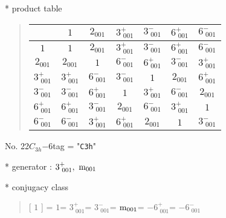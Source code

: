 \documentclass[fleqn,10pt,landscape]{jsarticle}
\begin{document}
* product table
\begin{quote}
\begin{tabular}{ccccccc} \hline \hline
 & $ 1 $ & $ 2{}_{001} $ & $ 3^{+}_{\,\,001} $ & $ 3^{-}_{\,\,001} $ & $ 6^{+}_{\,\,001} $ & $ 6^{-}_{\,\,001} $ \\ \hline
$ 1 $ & $ 1 $ & $ 2{}_{001} $ & $ 3^{+}_{\,\,001} $ & $ 3^{-}_{\,\,001} $ & $ 6^{+}_{\,\,001} $ & $ 6^{-}_{\,\,001} $ \\
$ 2{}_{001} $ & $ 2{}_{001} $ & $ 1 $ & $ 6^{-}_{\,\,001} $ & $ 6^{+}_{\,\,001} $ & $ 3^{-}_{\,\,001} $ & $ 3^{+}_{\,\,001} $ \\
$ 3^{+}_{\,\,001} $ & $ 3^{+}_{\,\,001} $ & $ 6^{-}_{\,\,001} $ & $ 3^{-}_{\,\,001} $ & $ 1 $ & $ 2{}_{001} $ & $ 6^{+}_{\,\,001} $ \\
$ 3^{-}_{\,\,001} $ & $ 3^{-}_{\,\,001} $ & $ 6^{+}_{\,\,001} $ & $ 1 $ & $ 3^{+}_{\,\,001} $ & $ 6^{-}_{\,\,001} $ & $ 2{}_{001} $ \\
$ 6^{+}_{\,\,001} $ & $ 6^{+}_{\,\,001} $ & $ 3^{-}_{\,\,001} $ & $ 2{}_{001} $ & $ 6^{-}_{\,\,001} $ & $ 3^{+}_{\,\,001} $ & $ 1 $ \\
$ 6^{-}_{\,\,001} $ & $ 6^{-}_{\,\,001} $ & $ 3^{+}_{\,\,001} $ & $ 6^{+}_{\,\,001} $ & $ 2{}_{001} $ & $ 1 $ & $ 3^{-}_{\,\,001} $ \\
 \hline \hline
\end{tabular}
\end{quote}

\newpage

No. 22\quad$C_{3h}$\quad$-6$\quad[ hexagonal ]
tag = "{\tt C3h}"

* generator : $3^{+}_{\,\,001},\,\,{\rm m}_{001}$

* conjugacy class
\begin{quote}
[ $1$ ] = \quad $1$\newline[ $3^{+}_{\,\,001}$ ] = \quad $3^{+}_{\,\,001}$\newline[ $3^{-}_{\,\,001}$ ] = \quad $3^{-}_{\,\,001}$\newline[ ${\rm m}_{001}$ ] = \quad ${\rm m}_{001}$\newline[ $-6^{+}_{\,\,001}$ ] = \quad $-6^{+}_{\,\,001}$\newline[ $-6^{-}_{\,\,001}$ ] = \quad $-6^{-}_{\,\,001}$\newline
\end{quote}
\end{document}
